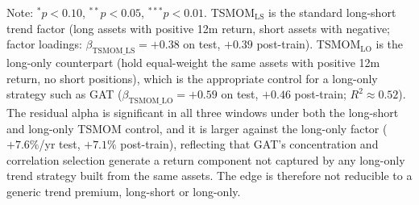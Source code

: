 \begin{table}[H]
\centering
\caption{Multifactor spanning alphas (Newey--West HAC, annualised)}
\label{tab:factors}
\small
\setlength{\tabcolsep}{4pt}
\begin{flushleft}
\footnotesize
Note: $^{*}p<0.10$, $^{**}p<0.05$, $^{***}p<0.01$.
TSMOM$_{\text{LS}}$ is the standard long-short trend factor (long assets with
positive 12m return, short assets with negative; factor loadings:
$\beta_{\text{TSMOM\_LS}}=+0.38$ on test, $+0.39$ post-train).
TSMOM$_{\text{LO}}$ is the long-only counterpart (hold equal-weight the same
assets with positive 12m return, no short positions), which is the appropriate
control for a long-only strategy such as GAT
($\beta_{\text{TSMOM\_LO}}=+0.59$ on test, $+0.46$ post-train; $R^2 \approx 0.52$).
The residual alpha is significant in all three windows under both the long-short
and long-only TSMOM control, and it is larger against the long-only
factor ($+7.6\%$/yr test, $+7.1\%$ post-train), reflecting that GAT's
concentration and correlation selection generate a return component not
captured by any long-only trend strategy built from the same assets.
The edge is therefore not reducible to a generic trend premium, long-short or long-only.


\end{flushleft}
\end{table}
